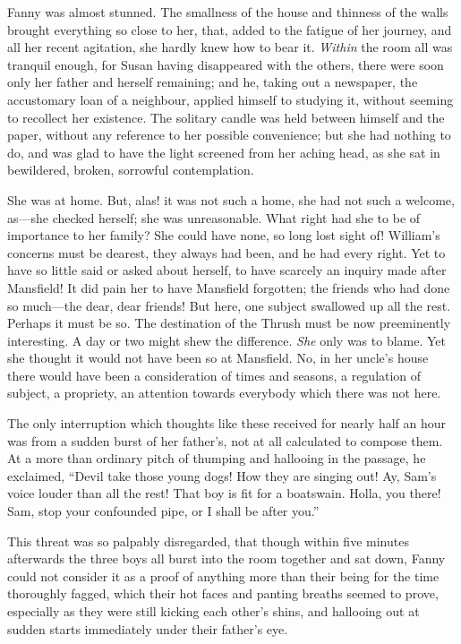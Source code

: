 Fanny was almost stunned.  The smallness of the house
and thinness of the walls brought everything so close
to her, that, added to the fatigue of her journey, and all
her recent agitation, she hardly knew how to bear it.
\emph{Within} the room all was tranquil enough, for Susan having
disappeared with the others, there were soon only her father
and herself remaining; and he, taking out a newspaper,
the accustomary loan of a neighbour, applied himself to
studying it, without seeming to recollect her existence.
The solitary candle was held between himself and the paper,
without any reference to her possible convenience;
but she had nothing to do, and was glad to have the light
screened from her aching head, as she sat in bewildered,
broken, sorrowful contemplation.

She was at home.  But, alas! it was not such a home,
she had not such a welcome, as---she checked herself;
she was unreasonable.  What right had she to be of importance
to her family?  She could have none, so long lost sight of!
William's concerns must be dearest, they always had been,
and he had every right.  Yet to have so little said
or asked about herself, to have scarcely an inquiry made
after Mansfield!  It did pain her to have Mansfield forgotten;
the friends who had done so much---the dear, dear friends!
But here, one subject swallowed up all the rest.
Perhaps it must be so.  The destination of the Thrush
must be now preeminently interesting.  A day or two
might shew the difference.  \emph{She} only was to blame.
Yet she thought it would not have been so at Mansfield.
No, in her uncle's house there would have been a
consideration of times and seasons, a regulation of subject,
a propriety, an attention towards everybody which there
was not here.

The only interruption which thoughts like these received
for nearly half an hour was from a sudden burst of her
father's, not at all calculated to compose them.  At a more
than ordinary pitch of thumping and hallooing in the passage,
he exclaimed, ``Devil take those young dogs!  How they are
singing out!  Ay, Sam's voice louder than all the rest!
That boy is fit for a boatswain.  Holla, you there!
Sam, stop your confounded pipe, or I shall be after you.''

This threat was so palpably disregarded, that though
within five minutes afterwards the three boys all burst
into the room together and sat down, Fanny could not
consider it as a proof of anything more than their being
for the time thoroughly fagged, which their hot faces
and panting breaths seemed to prove, especially as they
were still kicking each other's shins, and hallooing
out at sudden starts immediately under their father's eye.

